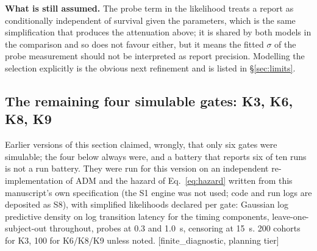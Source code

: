 \documentclass[9pt,twocolumn]{article}
\newcommand{\tier}[1]{{\sffamily\scriptsize\color{RRHMSlate}[#1]}}
\begin{document}
\textbf{What is still assumed.} The probe term in the likelihood treats a report as conditionally independent of survival given the parameters, which is the same simplification that produces the attenuation above; it is shared by both models in the comparison and so does not favour either, but it means the fitted $\sigma$ of the probe measurement should not be interpreted as report precision. Modelling the selection explicitly is the obvious next refinement and is listed in \S\ref{sec:limits}.

\subsection{The remaining four simulable gates: K3, K6, K8, K9}
\label{sec:simremaining}
Earlier versions of this section claimed, wrongly, that only six gates were simulable; the four below always were, and a battery that reports six of ten runs is not a run battery. They were run for this version on an independent re-implementation of ADM and the hazard of Eq.~\ref{eq:hazard} written from this manuscript's own specification (the S1 engine was not used; code and run logs are deposited as S8), with simplified likelihoods declared per gate: Gaussian log predictive density on log transition latency for the timing components, leave-one-subject-out throughout, probes at 0.3 and 1.0~s, censoring at 15~s. 200 cohorts for K3, 100 for K6/K8/K9 unless noted. \tier{finite\_diagnostic, planning tier}
\end{document}

